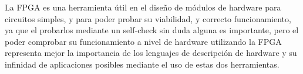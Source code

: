 \documentclass[journal]{IEEEtran}
\begin{document}
	La FPGA es una herramienta útil en el diseño de módulos de hardware para circuitos simples, y para poder probar su viabilidad, y correcto funcionamiento, ya que el probarlos mediante un self-check sin duda alguna es importante, pero el poder comprobar su funcionamiento a nivel de hardware utilizando la FPGA representa mejor la importancia de los lenguajes de descripción de hardware y su infinidad de aplicaciones posibles mediante el uso de estas dos herramientas.
	
	
	
\end{document}

